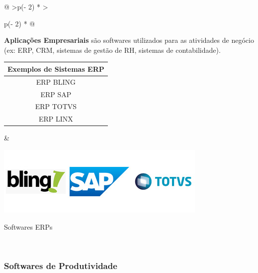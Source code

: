 \documentclass[
]{book}
\begin{document}
\begin{longtable}[]{@{}
  >{\centering\arraybackslash}p{(\columnwidth - 2\tabcolsep) * }
  >{\raggedright\arraybackslash}p{(\columnwidth - 2\tabcolsep) * }@{}}
\toprule\noalign{}
\endhead
\bottomrule\noalign{}
\endlastfoot
\begin{minipage}[t]{\linewidth}\centering
\textbf{Aplicações Empresariais} são softwares utilizados para as atividades de negócio (ex: ERP, CRM, sistemas de gestão de RH, sistemas de contabilidade).

\begin{longtable}[]{@{}c@{}}
\toprule\noalign{}
Exemplos de Sistemas ERP \\
\midrule\noalign{}
\endhead
\bottomrule\noalign{}
\endlastfoot
ERP BLING \\
ERP SAP \\
ERP TOTVS \\
ERP LINX \\
\end{longtable}
\end{minipage} & \begin{minipage}[t]{\linewidth}\raggedright
\begin{center}
\includegraphics{images/InfraEstrutura/software/erps.jpg}

Softwares ERPs
\end{center}
\end{minipage} \\
\end{longtable}

\subsubsection{Softwares de Produtividade}\label{softwares-de-produtividade}
\end{document}

